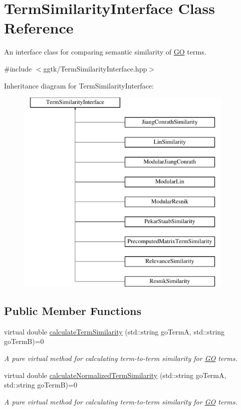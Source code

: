 \hypertarget{classTermSimilarityInterface}{}\section{Term\+Similarity\+Interface Class Reference}
\label{classTermSimilarityInterface}


An interface class for comparing semantic similarity of \hyperlink{namespaceGO}{GO} terms.  




{\ttfamily \#include $<$ggtk/\+Term\+Similarity\+Interface.\+hpp$>$}

Inheritance diagram for Term\+Similarity\+Interface\+:\begin{figure}[H]
\begin{center}
\leavevmode
\includegraphics[height=10.000000cm]{classTermSimilarityInterface}
\end{center}
\end{figure}
\subsection*{Public Member Functions}
\begin{DoxyCompactItemize}
\item 
virtual double \hyperlink{classTermSimilarityInterface_ae3474adcfcb02faef65ed5e16ef4db47}{calculate\+Term\+Similarity} (std\+::string go\+TermA, std\+::string go\+TermB)=0
\begin{DoxyCompactList}\small\item\em A pure virtual method for calculating term-\/to-\/term similarity for \hyperlink{namespaceGO}{GO} terms. \end{DoxyCompactList}\item 
virtual double \hyperlink{classTermSimilarityInterface_aa46b7870c7725faab85ec502a3e5242d}{calculate\+Normalized\+Term\+Similarity} (std\+::string go\+TermA, std\+::string go\+TermB)=0
\begin{DoxyCompactList}\small\item\em A pure virtual method for calculating term-\/to-\/term similarity for \hyperlink{namespaceGO}{GO} terms. \end{DoxyCompactList}\end{DoxyCompactItemize}


